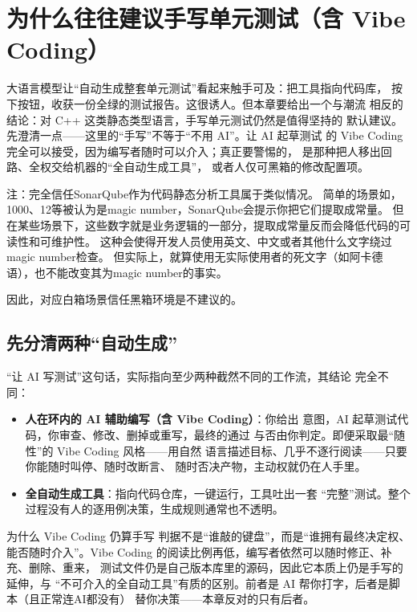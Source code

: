 \documentclass[12pt,a4paper,fontset=fandol]{ctexbook}
\begin{document}
\chapter{为什么往往建议手写单元测试（含 Vibe Coding）}

大语言模型让“自动生成整套单元测试”看起来触手可及：把工具指向代码库，
按下按钮，收获一份全绿的测试报告。这很诱人。但本章要给出一个与潮流
相反的结论：对 C++ 这类静态类型语言，手写单元测试仍然是值得坚持的
默认建议。先澄清一点——这里的“手写”不等于“不用 AI”。让 AI 起草测试
的 Vibe Coding 完全可以接受，因为编写者随时可以介入；真正要警惕的，
是那种把人移出回路、全权交给机器的“全自动生成工具”，
或者人仅可黑箱的修改配置项。

注：完全信任SonarQube作为代码静态分析工具属于类似情况。
简单的场景如，1000、12等被认为是magic number，SonarQube会提示你把它们提取成常量。
但在某些场景下，这些数字就是业务逻辑的一部分，提取成常量反而会降低代码的可读性和可维护性。
这种会使得开发人员使用英文、中文或者其他什么文字绕过magic number检查。
但实际上，就算使用无实际使用者的死文字（如阿卡德语），也不能改变其为magic number的事实。

因此，对应白箱场景信任黑箱环境是不建议的。

\section{先分清两种“自动生成”}

“让 AI 写测试”这句话，实际指向至少两种截然不同的工作流，其结论
完全不同：

\begin{itemize}
  \item \textbf{人在环内的 AI 辅助编写（含 Vibe Coding）}：你给出
        意图，AI 起草测试代码，你审查、修改、删掉或重写，最终的通过
        与否由你判定。即便采取最“随性”的 Vibe Coding 风格——用自然
        语言描述目标、几乎不逐行阅读——只要你能随时叫停、随时改断言、
        随时否决产物，主动权就仍在人手里。
  \item \textbf{全自动生成工具}：指向代码仓库，一键运行，工具吐出一套
        “完整”测试。整个过程没有人的逐用例决策，生成规则通常也不透明。
\end{itemize}

\begin{note}{为什么 Vibe Coding 仍算手写}
判据不是“谁敲的键盘”，而是“谁拥有最终决定权、能否随时介入”。Vibe
Coding 的阅读比例再低，编写者依然可以随时修正、补充、删除、重来，
测试文件仍是自己版本库里的源码，因此它本质上仍是手写的延伸，与
“不可介入的全自动工具”有质的区别。前者是 AI 帮你打字，后者是脚本（且正常连AI都没有）
替你决策——本章反对的只有后者。
\end{note}
\end{document}

